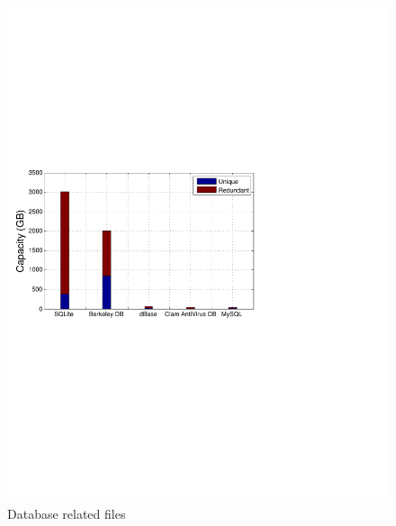 \begin{figure}[t]
	\centering
	\begin{minipage}{0.35\textwidth}
		\centering
		\includegraphics[width=1\textwidth]{graphs/type-db-cap.pdf}
		\caption{Database related files}
		\label{fig-dir}
	\end{minipage}%
	\begin{minipage}{0.3\textwidth}
		\centering

\end{minipage}
\end{figure}
